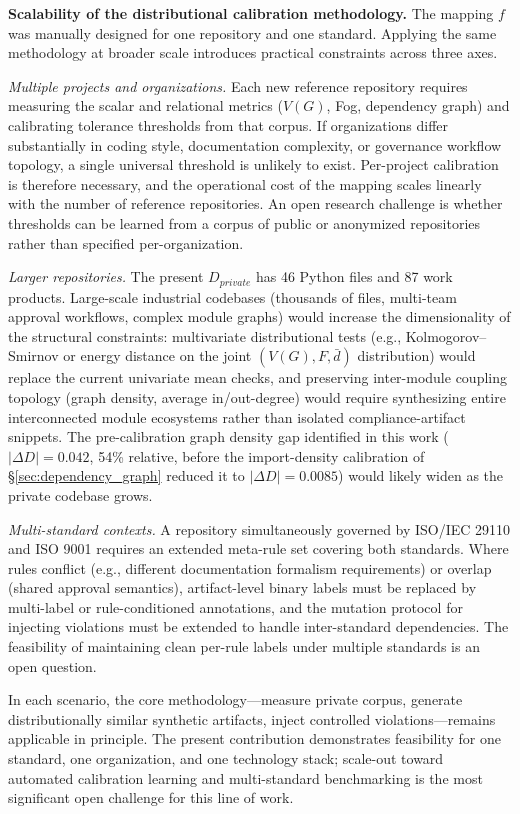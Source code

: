 \documentclass{ieeeaccess}
\begin{document}
\textbf{Scalability of the distributional calibration methodology.} The mapping $f$ was manually designed for one repository and one standard. Applying the same methodology at broader scale introduces practical constraints across three axes.

\emph{Multiple projects and organizations.} Each new reference repository requires measuring the scalar and relational metrics ($V(G)$, Fog, dependency graph) and calibrating tolerance thresholds from that corpus. If organizations differ substantially in coding style, documentation complexity, or governance workflow topology, a single universal threshold is unlikely to exist. Per-project calibration is therefore necessary, and the operational cost of the mapping scales linearly with the number of reference repositories. An open research challenge is whether thresholds can be learned from a corpus of public or anonymized repositories rather than specified per-organization.

\emph{Larger repositories.} The present $D_{private}$ has 46 Python files and 87 work products. Large-scale industrial codebases (thousands of files, multi-team approval workflows, complex module graphs) would increase the dimensionality of the structural constraints: multivariate distributional tests (e.g., Kolmogorov--Smirnov or energy distance on the joint $(V(G), F, \bar{d})$ distribution) would replace the current univariate mean checks, and preserving inter-module coupling topology (graph density, average in/out-degree) would require synthesizing entire interconnected module ecosystems rather than isolated compliance-artifact snippets. The pre-calibration graph density gap identified in this work ($|\Delta D|=0.042$, 54\% relative, before the import-density calibration of §\ref{sec:dependency_graph} reduced it to $|\Delta D|=0.0085$) would likely widen as the private codebase grows.

\emph{Multi-standard contexts.} A repository simultaneously governed by ISO/IEC 29110 and ISO 9001 requires an extended meta-rule set covering both standards. Where rules conflict (e.g., different documentation formalism requirements) or overlap (shared approval semantics), artifact-level binary labels must be replaced by multi-label or rule-conditioned annotations, and the mutation protocol for injecting violations must be extended to handle inter-standard dependencies. The feasibility of maintaining clean per-rule labels under multiple standards is an open question.

In each scenario, the core methodology---measure private corpus, generate distributionally similar synthetic artifacts, inject controlled violations---remains applicable in principle. The present contribution demonstrates feasibility for one standard, one organization, and one technology stack; scale-out toward automated calibration learning and multi-standard benchmarking is the most significant open challenge for this line of work.
\end{document}
